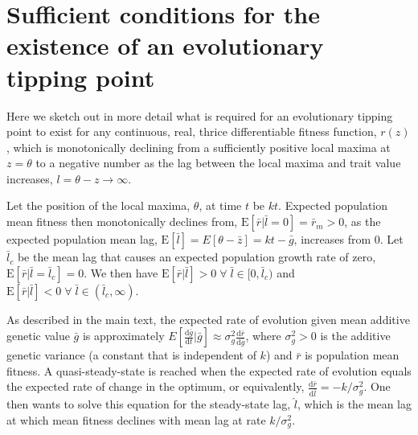 \documentclass[12pt,letterpaper]{article} %
\begin{document}
\section*{Sufficient conditions for the existence of an evolutionary tipping point}

Here we sketch out in more detail what is required for an evolutionary tipping point to exist for any continuous, real, thrice differentiable fitness function, $r(z)$, which is monotonically declining from a sufficiently positive local maxima at $z=\theta$ to a negative number as the lag between the local maxima and trait value increases, $l=\theta-z\rightarrow\infty$.

Let the position of the local maxima, $\theta$, at time $t$ be $k t$. %
Expected population mean fitness then monotonically declines from, $\mathrm{E}[\bar{r}|\bar{l}=0] = \bar{r}_m > 0$, as the expected population mean lag, $\mathrm{E}[\bar{l}] = E[\theta - \bar{z}] = k t - \bar{g}$, increases from 0. 
Let $\bar{l}_c$ be the mean lag that causes an expected population growth rate of zero, $\mathrm{E}[\bar{r}|\bar{l}=\bar{l}_c] = 0$.
We then have $\mathrm{E}[\bar{r}|\bar{l}] > 0\;\forall\;\bar{l}\in[0,\bar{l}_c)$ and $\mathrm{E}[\bar{r}|\bar{l}] < 0\;\forall\;\bar{l}\in(\bar{l}_c,\infty)$.

As described in the main text, the expected rate of evolution given mean additive genetic value $\bar{g}$ is approximately $E\left[\frac{\mathrm{d} \bar{g}}{\mathrm{d} t} \big| \bar{g} \right]\approx \sigma_{g}^2 \frac{\mathrm{d} \bar{r}}{\mathrm{d} \bar{g}}$, where $\sigma_g^2>0$ is the additive genetic variance (a constant that is independent of $k$) and $\bar{r}$ is population mean fitness.
A quasi-steady-state is reached when the expected rate of evolution equals the expected rate of change in the optimum, or equivalently, $\frac{\mathrm{d} \bar{r}}{\mathrm{d} \bar{l}} = -k/\sigma_{g}^2$.
One then wants to solve this equation for the steady-state lag, $\hat{l}$, which is the mean lag at which mean fitness declines with mean lag at rate $k/\sigma_g^2$.
\end{document}
